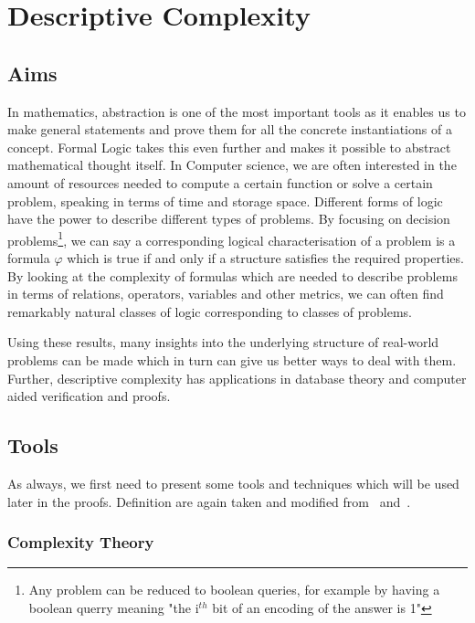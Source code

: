 \chapter{Descriptive Complexity}\label{ch:descriptive-complexity}


\section{Aims}\label{sec:aims}

In mathematics, abstraction is one of the most important tools as it enables us to make general statements and prove them for all the concrete instantiations of a concept.
Formal Logic takes this even further and makes it possible to abstract mathematical thought itself.
In Computer science, we are often interested in the amount of resources needed to compute a certain function or solve a certain problem, speaking in terms of time and storage space.
Different forms of logic have the power to describe different types of problems.
By focusing on decision problems\footnote{Any problem can be reduced to boolean queries, for example by having a boolean querry meaning "the i$^{th}$ bit of an encoding of the answer is 1"}, we can say a corresponding logical characterisation of a problem is a formula $\varphi$ which is true if and only if a structure satisfies the required properties.
By looking at the complexity of formulas which are needed to describe problems in terms of relations, operators, variables and other metrics, we can often find remarkably natural classes of logic corresponding to classes of problems.

Using these results, many insights into the underlying structure of real-world problems can be made which in turn can give us better ways to deal with them.
Further, descriptive complexity has applications in database theory and computer aided verification and proofs.


\section{Tools}\label{sec:tools}

As always, we first need to present some tools and techniques which will be used later in the proofs.
Definition are again taken and modified from~\cite{theory-cs} and~\cite{descriptive-complexity}.

\subsection{Complexity Theory}\label{subsec:complexity-theory}

